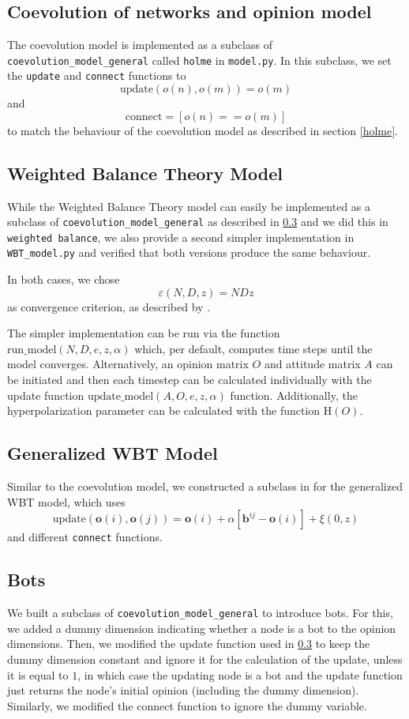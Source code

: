 \documentclass[11pt]{article}
\begin{document}
\subsection{Coevolution of networks and opinion model}

The coevolution model is implemented as a subclass of \texttt{coevolution\_model\_general} called \texttt{holme} in \texttt{model.py}. In this subclass, we set the \texttt{update} and \texttt{connect} functions to
\[\text{update}(o(n),o(m))=o(m)\] and \[\text{connect}= [o(n)==o(m)]\] to match the behaviour of the coevolution model as described in section \ref{holme}. 


\subsection{Weighted Balance Theory Model}
While the Weighted Balance Theory model can easily be implemented as a subclass of \texttt{coevolution\_model\_general} as described in \ref{WBTgen} and we did this in \texttt{weighted balance}, we also provide a second simpler implementation in \texttt{WBT\_model.py} and verified that both versions produce the same behaviour. 

In both cases, we chose  
\[
\varepsilon(N,D,z) = NDz
\]
as convergence criterion, as described by \citet{schweighofer2020}. 

The simpler implementation can be run via the function $\text{run\_model}(N,D, e, z,\alpha)$ which, per default, computes time steps until the model converges. Alternatively, an opinion matrix $O$ and attitude matrix $A$ can be initiated and then each timestep can be calculated individually with the update function $\text{update\_model}(A, O, e, z, \alpha)$ function. Additionally, the hyperpolarization parameter can be calculated with the function $\text{H}(O)$. 


\subsection{Generalized WBT Model}\label{WBTgen}

Similar to the coevolution model, we constructed a subclass   in  for the generalized WBT model, which uses \[
\text{update}(\mathbf{o}(i),\mathbf{o}(j)) =  \mathbf{o}(i) + \alpha \left[\mathbf{b}^{ij}-\mathbf{o}(i)\right]+\xi(0,z)
\] and different \texttt{connect} functions. 

\subsection{Bots}
We built a subclass  of \texttt{coevolution\_model\_general} to introduce bots. For this, we added a dummy dimension indicating whether a node is a bot to the opinion dimensions. Then, we modified the update function used in \ref{WBTgen} to keep the dummy dimension constant and ignore it for the calculation of the update, unless it is equal to $1$, in which case the updating node is a bot and the update function just returns the node's initial opinion (including the dummy dimension). Similarly, we modified the connect function to ignore the dummy variable.
\end{document}
